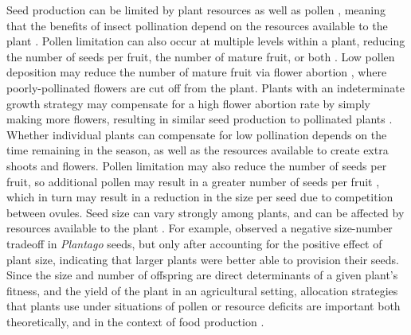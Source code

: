 \documentclass[12pt]{article} %
\begin{document}
Seed production can be limited by plant resources as well as pollen \citep{galen1985, haig1988,campbell1993}, meaning that the benefits of insect pollination depend on the resources available to the plant \citep{stephenson1981, tamburini2017}.
Pollen limitation can also occur at multiple levels within a plant, reducing the number of seeds per fruit, the number of mature fruit, or both \citep{burd1994}.
Low pollen deposition may reduce the number of mature fruit via flower abortion \citep{knight2006}, where poorly-pollinated flowers are cut off from the plant.
Plants with an indeterminate growth strategy may compensate for a high flower abortion rate by simply making more flowers, resulting in similar seed production to pollinated plants \citep{doust1982,lawrence1993, sabbahi2006, bos2007}.
Whether individual plants can compensate for low pollination depends on the time remaining in the season, as well as the resources available to create extra shoots and flowers.
Pollen limitation may also reduce the number of seeds per fruit, so additional pollen may result in a greater number of seeds per fruit \citep{knight2006}, which in turn may result in a reduction in the size per seed \citep{free1968, mazer1987} due to competition between ovules.
Seed size can vary strongly among plants, and can be affected by resources available to the plant \citep{mazer1987, venable1992}. 
For example, \citet{maddox1983} observed a negative size-number tradeoff in \emph{Plantago} seeds, but only after accounting for the positive effect of plant size, indicating that larger plants were better able to provision their seeds.
Since the size and number of offspring are direct determinants of a given plant's fitness, and the yield of the plant in an agricultural setting, allocation strategies that plants use under situations of pollen or resource deficits are important both theoretically, and in the context of food production \citep{bos2007, tamburini2019}. 
\end{document}
